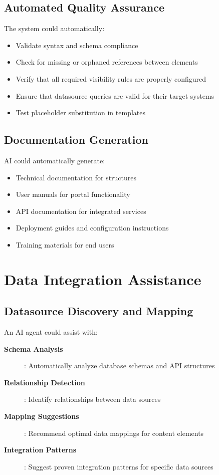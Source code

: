 \subsection{Automated Quality Assurance}

The system could automatically:
\begin{itemize}
\item Validate \wbdl{} syntax and schema compliance
\item Check for missing or orphaned references between elements
\item Verify that all required visibility rules are properly configured
\item Ensure that datasource queries are valid for their target systems
\item Test placeholder substitution in \wbpl{} templates
\end{itemize}

\subsection{Documentation Generation}

AI could automatically generate:
\begin{itemize}
\item Technical documentation for \webbase{} structures
\item User manuals for portal functionality
\item API documentation for integrated services
\item Deployment guides and configuration instructions
\item Training materials for end users
\end{itemize}

\section{Data Integration Assistance}
\label{sec:data-integration}

\subsection{Datasource Discovery and Mapping}

An AI agent could assist with:

\begin{description}
\item[\textbf{Schema Analysis}]: Automatically analyze database schemas and API structures
\item[\textbf{Relationship Detection}]: Identify relationships between data sources
\item[\textbf{Mapping Suggestions}]: Recommend optimal data mappings for content elements
\item[\textbf{Integration Patterns}]: Suggest proven integration patterns for specific data sources
\end{description}

